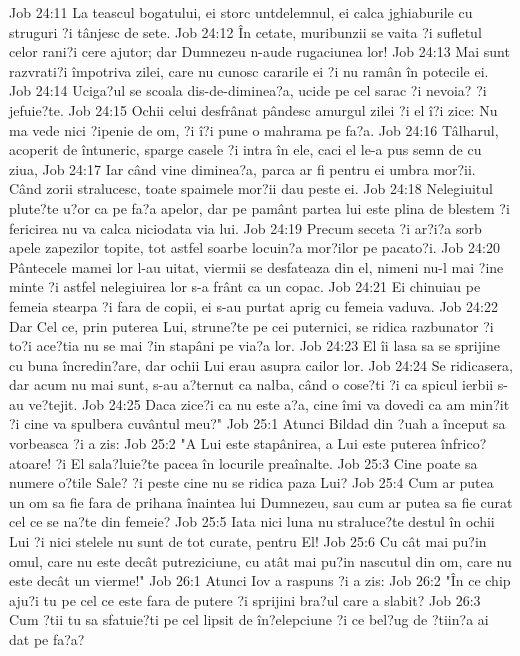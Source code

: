 Job 24:11  La teascul bogatului, ei storc untdelemnul, ei calca jghiaburile cu struguri ?i tânjesc de sete.
Job 24:12  În cetate, muribunzii se vaita ?i sufletul celor rani?i cere ajutor; dar Dumnezeu n-aude rugaciunea lor!
Job 24:13  Mai sunt razvrati?i împotriva zilei, care nu cunosc cararile ei ?i nu ramân în potecile ei.
Job 24:14  Uciga?ul se scoala dis-de-diminea?a, ucide pe cel sarac ?i nevoia? ?i jefuie?te.
Job 24:15  Ochii celui desfrânat pândesc amurgul zilei ?i el î?i zice: Nu ma vede nici ?ipenie de om, ?i î?i pune o mahrama pe fa?a.
Job 24:16  Tâlharul, acoperit de întuneric, sparge casele ?i intra în ele, caci el le-a pus semn de cu ziua,
Job 24:17  Iar când vine diminea?a, parca ar fi pentru ei umbra mor?ii. Când zorii stralucesc, toate spaimele mor?ii dau peste ei.
Job 24:18  Nelegiuitul plute?te u?or ca pe fa?a apelor, dar pe pamânt partea lui este plina de blestem ?i fericirea nu va calca niciodata via lui.
Job 24:19  Precum seceta ?i ar?i?a sorb apele zapezilor topite, tot astfel soarbe locuin?a mor?ilor pe pacato?i.
Job 24:20  Pântecele mamei lor l-au uitat, viermii se desfateaza din el, nimeni nu-l mai ?ine minte ?i astfel nelegiuirea lor s-a frânt ca un copac.
Job 24:21  Ei chinuiau pe femeia stearpa ?i fara de copii, ei s-au purtat aprig cu femeia vaduva.
Job 24:22  Dar Cel ce, prin puterea Lui, strune?te pe cei puternici, se ridica razbunator ?i to?i ace?tia nu se mai ?in stapâni pe via?a lor.
Job 24:23  El îi lasa sa se sprijine cu buna încredin?are, dar ochii Lui erau asupra cailor lor.
Job 24:24  Se ridicasera, dar acum nu mai sunt, s-au a?ternut ca nalba, când o cose?ti ?i ca spicul ierbii s-au ve?tejit.
Job 24:25  Daca zice?i ca nu este a?a, cine îmi va dovedi ca am min?it ?i cine va spulbera cuvântul meu?"
Job 25:1  Atunci Bildad din ?uah a început sa vorbeasca ?i a zis:
Job 25:2  "A Lui este stapânirea, a Lui este puterea înfrico?atoare! ?i El sala?luie?te pacea în locurile preaînalte.
Job 25:3  Cine poate sa numere o?tile Sale? ?i peste cine nu se ridica paza Lui?
Job 25:4  Cum ar putea un om sa fie fara de prihana înaintea lui Dumnezeu, sau cum ar putea sa fie curat cel ce se na?te din femeie?
Job 25:5  Iata nici luna nu straluce?te destul în ochii Lui ?i nici stelele nu sunt de tot curate, pentru El!
Job 25:6  Cu cât mai pu?in omul, care nu este decât putreziciune, cu atât mai pu?in nascutul din om, care nu este decât un vierme!"
Job 26:1  Atunci Iov a raspuns ?i a zis:
Job 26:2  "În ce chip aju?i tu pe cel ce este fara de putere ?i sprijini bra?ul care a slabit?
Job 26:3  Cum ?tii tu sa sfatuie?ti pe cel lipsit de în?elepciune ?i ce bel?ug de ?tiin?a ai dat pe fa?a?
